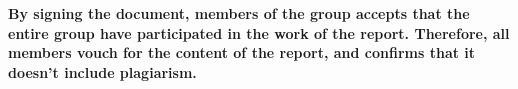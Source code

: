 \vspace{3cm}
\textbf{By signing the document, members of the group accepts that the entire group have participated in the work of the report. Therefore, all members vouch for the content of the report, and confirms that it doesn't include plagiarism.}

\clearpage
\tableofcontents












\printbibliography

